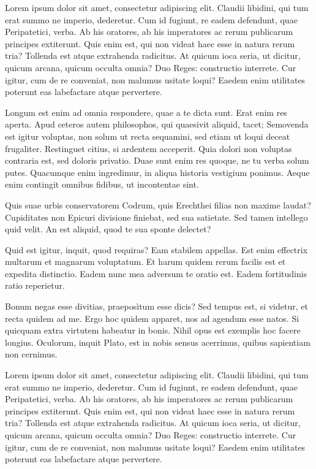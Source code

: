 \documentclass[12pt,twoside]{article}
\begin{document}
	Lorem ipsum dolor sit amet, consectetur adipiscing elit. Claudii libidini, qui tum erat summo ne imperio, dederetur. Cum id fugiunt, re eadem defendunt, quae Peripatetici, verba. Ab his oratores, ab his imperatores ac rerum publicarum principes extiterunt. Quis enim est, qui non videat haec esse in natura rerum tria? Tollenda est atque extrahenda radicitus. At quicum ioca seria, ut dicitur, quicum arcana, quicum occulta omnia? Duo Reges: constructio interrete. Cur igitur, cum de re conveniat, non malumus usitate loqui? Eaedem enim utilitates poterunt eas labefactare atque pervertere.
	
	Longum est enim ad omnia respondere, quae a te dicta sunt. Erat enim res aperta. Apud ceteros autem philosophos, qui quaesivit aliquid, tacet; Semovenda est igitur voluptas, non solum ut recta sequamini, sed etiam ut loqui deceat frugaliter. Restinguet citius, si ardentem acceperit. Quia dolori non voluptas contraria est, sed doloris privatio. Duae sunt enim res quoque, ne tu verba solum putes. Quacumque enim ingredimur, in aliqua historia vestigium ponimus. Aeque enim contingit omnibus fidibus, ut incontentae sint.
	
	Quis suae urbis conservatorem Codrum, quis Erechthei filias non maxime laudat? Cupiditates non Epicuri divisione finiebat, sed sua satietate. Sed tamen intellego quid velit. An est aliquid, quod te sua sponte delectet?
	
	Quid est igitur, inquit, quod requiras? Eam stabilem appellas. Est enim effectrix multarum et magnarum voluptatum. Et harum quidem rerum facilis est et expedita distinctio. Eadem nunc mea adversum te oratio est. Eadem fortitudinis ratio reperietur.
	
	Bonum negas esse divitias, praeposìtum esse dicis? Sed tempus est, si videtur, et recta quidem ad me. Ergo hoc quidem apparet, nos ad agendum esse natos. Si quicquam extra virtutem habeatur in bonis. Nihil opus est exemplis hoc facere longius. Oculorum, inquit Plato, est in nobis sensus acerrimus, quibus sapientiam non cernimus.
	
	Lorem ipsum dolor sit amet, consectetur adipiscing elit. Claudii libidini, qui tum erat summo ne imperio, dederetur. Cum id fugiunt, re eadem defendunt, quae Peripatetici, verba. Ab his oratores, ab his imperatores ac rerum publicarum principes extiterunt. Quis enim est, qui non videat haec esse in natura rerum tria? Tollenda est atque extrahenda radicitus. At quicum ioca seria, ut dicitur, quicum arcana, quicum occulta omnia? Duo Reges: constructio interrete. Cur igitur, cum de re conveniat, non malumus usitate loqui? Eaedem enim utilitates poterunt eas labefactare atque pervertere.
	
\end{document}
